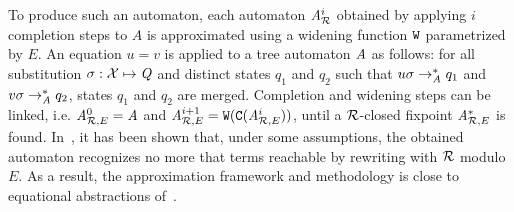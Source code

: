To produce such an automaton, each automaton ${\it A}_{\mathcal R}^i$ obtained by
applying $i$ completion steps to $A$ is approximated using a
widening function $\mathtt{W}$ parametrized by $E$. An equation $u=v$ is
applied to a tree automaton $\mathit A$ as follows: for all substitution
$\sigma:\mathcal X \mapsto \mathit Q$ and distinct states $q_1$ and $q_2$ such that
$u \sigma \rightarrow_{\mathit A}^* q_1$ and $v\sigma \rightarrow_{\mathit A}^* q_2$, states $q_1$
and $q_2$ are merged.  Completion and widening steps can be
linked, i.e. ${\it A}_{\mathcal R,E}^0=\mathit A$ and ${\it A}_{\mathcal R,E}^{i+1}= \mathtt{W}(\mathtt{C}({\it A}_{\mathcal R,E}^i))$, until a
$\mathcal R$-closed fixpoint $\mathit A^*_{\mathcal R,E}$ is found.  In~\cite{GenetR-JSC10}, it
has been shown that, under some assumptions, the obtained automaton
recognizes no more that terms reachable by rewriting with $\mathcal R$ modulo
$E$. As a result, the approximation framework and methodology is close
to equational abstractions of~\cite{MeseguerPM-TCS08}.






